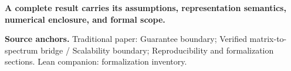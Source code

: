 \documentclass[11pt]{article}
\begin{document}
\begin{tcolorbox}[colback=pale,colframe=teal,boxrule=.4pt,arc=2pt,left=7pt,right=7pt,top=5pt,bottom=5pt]\small\bfseries A complete result carries its assumptions, representation semantics, numerical enclosure, and formal scope.\end{tcolorbox}
\vfill{\footnotesize\color{navy}\textbf{Source anchors.} Traditional paper: Guarantee boundary; Verified matrix-to-spectrum bridge / Scalability boundary; Reproducibility and formalization sections. Lean companion: formalization inventory.}
\end{document}
